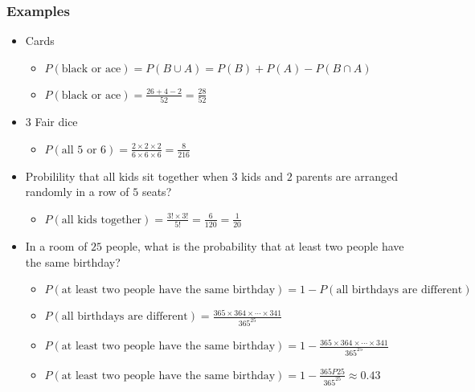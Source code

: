 \documentclass[12pt]{article}
\begin{document}
                \subsubsection{Examples}
                    \begin{itemize}
                        \item Cards
                        \begin{itemize}
                            \item $P(\text{black or ace}) = P(B \cup A) = P(B) + P(A) - P(B \cap A)$
                            \item $P(\text{black or ace}) = \frac{26 + 4 - 2}{52} = \frac{28}{52}$
                        \end{itemize}
                        \item 3 Fair dice
                        \begin{itemize}
                            \item $P(\text{all }5\text{ or }6) = \frac{2 \times 2 \times 2}{6 \times 6 \times 6} = \frac{8}{216}$
                        \end{itemize}
                        \item Probilility that all kids sit together when $3$ kids and $2$ parents are arranged randomly in a row of $5$ seats?
                        \begin{itemize}
                            \item $P(\text{all kids together}) = \frac{3! \times 3!}{5!} = \frac{6}{120} = \frac{1}{20}$
                        \end{itemize}
                        \item In a room of $25$ people, what is the probability that at least two people have the same birthday?
                        \begin{itemize}
                            \item $P(\text{at least two people have the same birthday}) = 1 - P(\text{all birthdays are different})$
                            \item $P(\text{all birthdays are different}) = \frac{365 \times 364 \times \cdots \times 341}{365^{25}}$
                            \item $P(\text{at least two people have the same birthday}) = 1 - \frac{365 \times 364 \times \cdots \times 341}{365^{25}}$
                            \item $P(\text{at least two people have the same birthday}) = 1 - \frac{365P25}{365^{25}} \approx 0.43$
                        \end{itemize}
                    \end{itemize}
\end{document}
